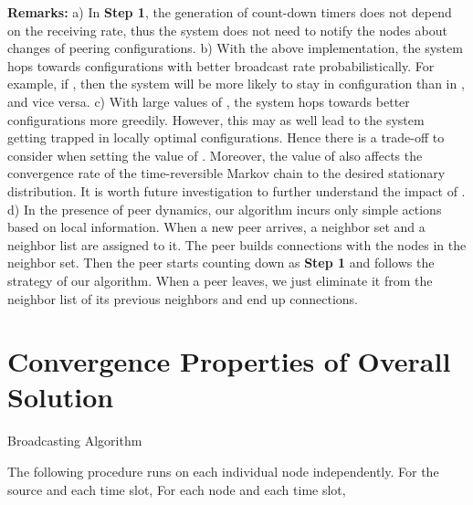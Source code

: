 \documentclass[10pt,conference]{IEEEtran}
\begin{document}
\textbf{Remarks:} a) In \textbf{Step 1}, the generation of count-down
timers does not depend on the receiving rate, thus the system does
not need to notify the nodes about changes of peering configurations.
b) With the above implementation, the system hops towards configurations
with better broadcast rate probabilistically. For example, if ,
then the system will be more likely to stay in configuration 
than in , and vice versa. c) With large values of , the system
hops towards better configurations more greedily. However,
this may as well lead to the system getting trapped in locally optimal configurations.
Hence there is a trade-off to consider when setting the value of .
Moreover, the value of  also affects the convergence rate
of the time-reversible Markov chain to the desired stationary distribution.
It is worth future investigation to further understand the impact
of . d) In the presence of peer dynamics, our algorithm incurs only simple actions based on local information. When a new peer arrives, a neighbor set and a neighbor list are assigned
to it. The peer builds connections with the nodes in the neighbor set. Then the peer starts counting down as \textbf{Step 1} and follows the strategy of our algorithm. When a peer leaves, we just eliminate it from the neighbor list of its previous neighbors and end up connections.

\section{Convergence Properties of Overall Solution}

\label{sec:bp+ma}

\begin{algorithm}[hbt!]
\caption{Broadcasting Algorithm}
\label{alg:bp}
\begin{algorithmic}[1]
\STATE The following procedure runs on each individual node independently.
\STATE For the source  and each time slot,
\STATE 
\STATE For each node  and each time slot,
\STATE 
\FOR {}
   \STATE {}
   \ENDFOR
   \IF {}
   \STATE {}
   \STATE {}
   \ENDIF
\ENDFOR
\IF {}
   \FOR {}
      \IF {}
      \STATE {}
      \ENDIF
   \ENDFOR
\ENDIF
\FOR {}
\STATE {}
\ENDFOR
\end{algorithmic}
\end{algorithm}
\end{document}
